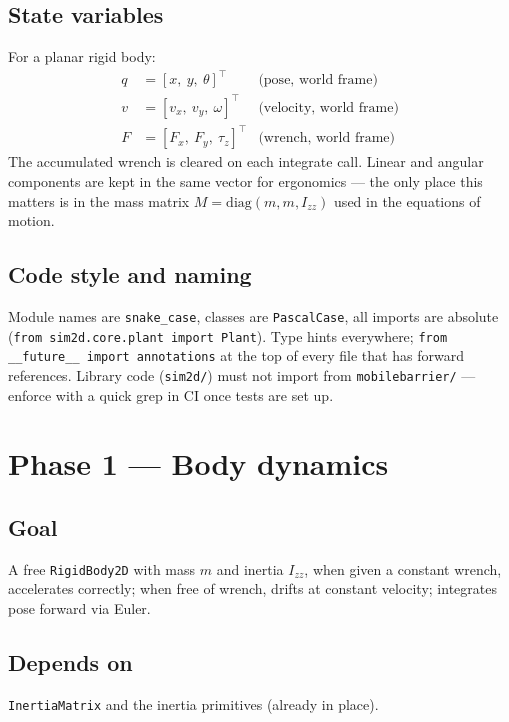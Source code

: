 \documentclass[11pt,a4paper]{article}
\newcommand{\code}[1]{\texttt{\small #1}}
\begin{document}
\subsection{State variables}

For a planar rigid body:
\begin{align}
    q     &= [x,\ y,\ \theta]^\top      &\text{(pose, world frame)} \\
    v     &= [v_x,\ v_y,\ \omega]^\top  &\text{(velocity, world frame)} \\
    F     &= [F_x,\ F_y,\ \tau_z]^\top  &\text{(wrench, world frame)}
\end{align}
The accumulated wrench is cleared on each integrate call. Linear and
angular components are kept in the same vector for ergonomics --- the only
place this matters is in the mass matrix
$M = \mathrm{diag}(m, m, I_{zz})$ used in the equations of motion.

\subsection{Code style and naming}

Module names are \code{snake\_case}, classes are \code{PascalCase}, all
imports are absolute (\code{from sim2d.core.plant import Plant}). Type
hints everywhere; \code{from \_\_future\_\_ import annotations} at the top
of every file that has forward references. Library code (\code{sim2d/}) must
not import from \code{mobilebarrier/} --- enforce with a quick grep in CI
once tests are set up.

\section{Phase 1 --- Body dynamics}
\label{sec:body}

\subsection*{Goal}
A free \code{RigidBody2D} with mass $m$ and inertia $I_{zz}$, when given a
constant wrench, accelerates correctly; when free of wrench, drifts at
constant velocity; integrates pose forward via Euler.

\subsection*{Depends on}
\code{InertiaMatrix} and the inertia primitives (already in place).
\end{document}
